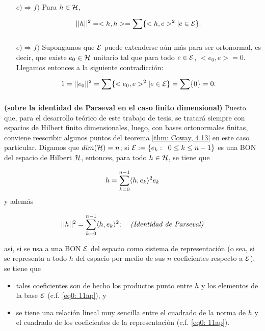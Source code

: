 \begin{itemize}
\item[$e) \Rightarrow f)$] Para $h \in \mathcal{H}$,
\[
||h||^{2}=<h,h> = \sum\limits_{}^{}\{ <h,e>^{2}| e \in \mathcal{E} \}.
\]

\item[$e) \Rightarrow f)$]
Supongamos que $\mathcal{E}$ puede extenderse aún más
para ser ortonormal, es decir, que existe 
$e_{0} \in \mathcal{H}$ unitario tal que
para todo $e \in \mathcal{E}$, $<e_{0}, e>=0$. 
Llegamos entonces a la siguiente contradicción:
\[
1=||e_{0}||^{2}=\sum\limits_{}^{}\{ <e_{0}, e>^{2}| e \in \mathcal{E} \}=
\sum\limits_{}^{}\{ 0\}=0.
\]
\QEDB
\end{itemize}
\vspace{0.2cm}


\begin{nota}
\label{nota: sobre la identidad de parseval}
\textbf{(sobre la identidad de Parseval en el
caso finito dimensional)}
Puesto que, para el desarrollo teórico de este trabajo de tesis,
se tratará siempre con espacios de Hilbert finito dimensionales, luego, con
bases ortonormales finitas, conviene
reescribir algunos puntos del teorema 
\ref{thm: Coway, 4.13} en este caso particular.
Digamos que $dim(\mathcal{H})=n$; si 
$\mathcal{E} := \{e_{k}: \hspace{0.2cm} 0 \leq k \leq n-1 \}$ es una
BON del espacio de Hilbert $\mathcal{H}$, entonces, para todo
$h \in \mathcal{H}$, se tiene que 

\begin{equation}
\label{eq0: 11ap}
h = \sum\limits_{k=0}^{n-1}\langle h , e_{k} \rangle^{2} e_{k}
\end{equation}
y además

\begin{equation}
\label{eq1: 11ap}
|| h ||^{2} = \sum\limits_{k=0}^{n-1}\langle h , e_{k} \rangle^{2};
\hspace{0.4cm} \textit{(Identidad de Parseval)}
\end{equation}


\noindent
así, si se usa a una BON $\mathcal{E}$ del espacio como sistema
de representación (o sea, si se representa a todo $h$ del espacio 
por medio de sus $n$ coeficientes respecto a $\mathcal{E}$), se tiene que
\begin{itemize}
	\item tales coeficientes son de hecho los productos punto entre
	$h$ y los elementos de la base $\mathcal{E}$ (c.f. 
	\eqref{eq0: 11ap}), y
	\item se tiene una relación lineal muy sencilla entre el cuadrado
	de la norma de $h$ y el cuadrado de los coeficientes de la representación
	(c.f. \eqref{eq0: 11ap}).
\end{itemize}


\end{nota}
